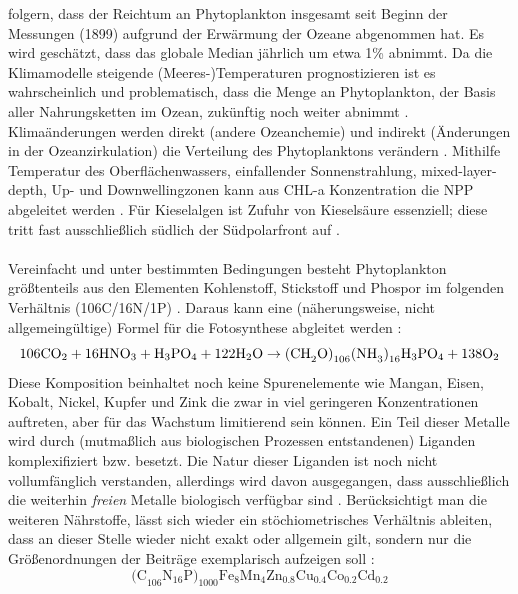 \documentclass[12pt,a4paper,onecolumn,draft]{scrartcl}
\newcommand{\cotwo}{CO\textsubscript{2}}
\begin{document}
\citet{Boyce.2010} folgern, dass der Reichtum an Phytoplankton insgesamt seit Beginn der Messungen (1899) aufgrund der Erwärmung der Ozeane abgenommen hat. Es wird geschätzt, dass das globale Median jährlich um etwa 1\% abnimmt. Da die Klimamodelle steigende (Meeres-)Temperaturen prognostizieren ist es wahrscheinlich und problematisch, dass die Menge an Phytoplankton, der Basis aller Nahrungsketten im Ozean, zukünftig noch weiter abnimmt \citep{Siegel.2010}. Klimaänderungen werden direkt (andere Ozeanchemie) und indirekt (Änderungen in der Ozeanzirkulation) die Verteilung des Phytoplanktons verändern \citep{Falkowski.1998}. Mithilfe Temperatur des Oberflächenwassers, einfallender Sonnenstrahlung, mixed-layer-depth, Up- und Downwellingzonen kann aus CHL-a Konzentration die NPP abgeleitet werden \citep{Falkowski.1998}. Für Kieselalgen ist Zufuhr von Kieselsäure essenziell; diese tritt fast ausschließlich südlich der Südpolarfront auf \citep{Falkowski.1998}.
\\\\
Vereinfacht und unter bestimmten Bedingungen besteht Phytoplankton größtenteils aus den Elementen Kohlenstoff, Stickstoff und Phospor im folgenden Verhältnis (106C/16N/1P) \citep{Falkowski.1998}. Daraus kann eine (näherungsweise, nicht allgemeingültige) Formel für die Fotosynthese abgleitet werden \citep{Emerson.2009}:
\begin{equation}
\text{106\cotwo} + \text{16HNO}_3 + \text{H}_3\text{PO}_4 + \text{122H}_2\text{O} \rightarrow \text{(CH}_2\text{O)}_{106}\text{(NH}_3\text{)}_{16}\text{H}_3\text{PO}_4 + \text{138O}_2
\end{equation}
Diese Komposition beinhaltet noch keine Spurenelemente wie Mangan, Eisen, Kobalt, Nickel, Kupfer und Zink die zwar in viel geringeren Konzentrationen auftreten, aber für das Wachstum limitierend sein können. Ein Teil dieser Metalle wird durch (mutmaßlich aus biologischen Prozessen entstandenen) Liganden komplexifiziert bzw. besetzt. Die Natur dieser Liganden ist noch nicht vollumfänglich verstanden, allerdings wird davon ausgegangen, dass ausschließlich die weiterhin \textit{freien} Metalle biologisch verfügbar sind \citep{Emerson.2009}. Berücksichtigt man die weiteren Nährstoffe, lässt sich wieder ein stöchiometrisches Verhältnis ableiten, dass an dieser Stelle wieder nicht exakt oder allgemein gilt, sondern nur die Größenordnungen der Beiträge exemplarisch aufzeigen soll \citep{Emerson.2009}:
\begin{equation}
\text{(C}_{106} \text{N}_{16} \text{P)}_{1000} \text{Fe}_8\text{Mn}_4\text{Zn}_{0.8}\text{Cu}_{0.4}\text{Co}_{0.2} \text{Cd}_{0.2}
\end{equation}
\end{document}
